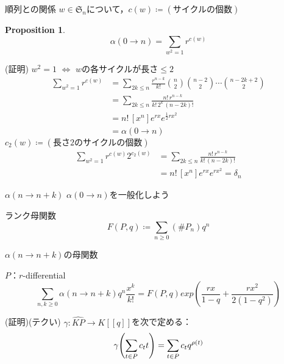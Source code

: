 \documentclass[aspectratio=98, 8pt, t]{beamer}
\renewcommand{\left}{\mleft}
\renewcommand{\right}{\mright}
\theoremstyle{definition}
\newtheorem{proposition}{Proposition}
\newcommand{\paren}[1]{\left( #1 \right)}
\newcommand{\wKP}{\widehat{KP}}
\begin{document}
\begin{frame}{順列との関係}
  $w \in \mathfrak{S}_n$について，$c(w) \coloneqq (\text{サイクルの個数})$
  \begin{proposition}
    \begin{equation*}
      \alpha(0 \to n) = \sum_{w^2 = 1} r^{c(w)}
    \end{equation*}
  \end{proposition}
  (証明) \pause $w^2 = 1$ $\iff$ $w$の各サイクルが長さ$\leq 2$
  \pause \begin{align*}
    \sum_{w^2=1} r^{c(w)}
    &= \sum_{2k \leq n} \frac{r^{n-k}}{k!} \binom{n}{2} \binom{n-2}{2} \cdots \binom{n-2k+2}{2} \\
    &= \sum_{2k \leq n} \frac{n! \, r^{n-k}}{k! \, 2^k \, (n-2k)!} \\
    &= n! \, [x^n] e^{rx} e^{\frac{1}{2} rx^2} \\
    &= \alpha(0 \to n)
  \end{align*}
  \pause $c_2(w) \coloneqq (\text{長さ$2$のサイクルの個数})$ \begin{align*}
    \sum_{w^2=1} r^{c(w)} 2^{c_2(w)}
    &= \sum_{2k \leq n} \frac{n! \, r^{n-k}}{k! \, (n-2k)!} \\
    &= n! \, [x^n] e^{rx} e^{rx^2} = \delta_n
  \end{align*}
\end{frame}

\begin{frame}{$\alpha(n \to n+k)$}
  $\alpha(0 \to n)$を一般化しよう

  \pause ランク母関数 \begin{equation*}
    F(P, q) \coloneqq \sum_{n \geq 0} (\#P_n) q^n
  \end{equation*}
\end{frame}

\begin{frame}{$\alpha(n \to n+k)$の母関数}
  \begin{theorem}[3.21.11]
    $P$：$r$-differential
    \begin{equation*}
      \sum_{n, k \geq 0} \alpha(n \to n+k) q^n \frac{x^k}{k!}
      = F(P, q) exp(\frac{rx}{1-q} + \frac{rx^2}{2(1-q^2)})
    \end{equation*}
  \end{theorem}
  (証明)(テクい) \pause
  $\gamma: \wKP \to K[[q]]$を次で定める：\begin{equation*}
    \gamma\paren{\sum_{t \in P} c_t t} = \sum_{t \in P} c_t q^{\rho(t)}
  \end{equation*}
\end{frame}
\end{document}
